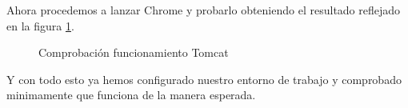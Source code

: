 \documentclass{scrartcl}
\begin{document}
Ahora procedemos a lanzar Chrome y probarlo obteniendo el resultado reflejado en la figura \ref{fig:ConfEcl07}.
\begin{figure}[H]
	
	\centering
	\caption{Comprobación funcionamiento Tomcat}
	\label{fig:ConfEcl07}
	
\end{figure}

Y con todo esto ya hemos configurado nuestro entorno de trabajo y comprobado minimamente que funciona de la manera esperada.
	
\end{document}
